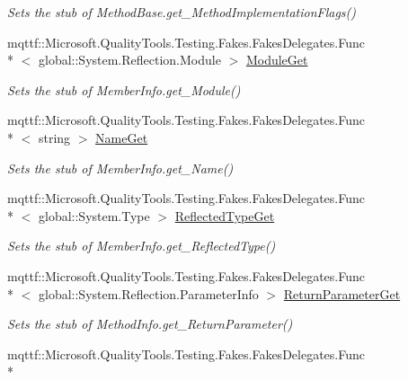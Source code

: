 \begin{DoxyCompactItemize}
\begin{DoxyCompactList}\small\item\em Sets the stub of Method\-Base.\-get\-\_\-\-Method\-Implementation\-Flags()\end{DoxyCompactList}\item 
mqttf\-::\-Microsoft.\-Quality\-Tools.\-Testing.\-Fakes.\-Fakes\-Delegates.\-Func\\*
$<$ global\-::\-System.\-Reflection.\-Module $>$ \hyperlink{class_system_1_1_reflection_1_1_fakes_1_1_stub_method_info_a620c5971673cda758bb46c427c317c3a}{Module\-Get}
\begin{DoxyCompactList}\small\item\em Sets the stub of Member\-Info.\-get\-\_\-\-Module()\end{DoxyCompactList}\item 
mqttf\-::\-Microsoft.\-Quality\-Tools.\-Testing.\-Fakes.\-Fakes\-Delegates.\-Func\\*
$<$ string $>$ \hyperlink{class_system_1_1_reflection_1_1_fakes_1_1_stub_method_info_abc33565f98fd727217015bf07f0422be}{Name\-Get}
\begin{DoxyCompactList}\small\item\em Sets the stub of Member\-Info.\-get\-\_\-\-Name()\end{DoxyCompactList}\item 
mqttf\-::\-Microsoft.\-Quality\-Tools.\-Testing.\-Fakes.\-Fakes\-Delegates.\-Func\\*
$<$ global\-::\-System.\-Type $>$ \hyperlink{class_system_1_1_reflection_1_1_fakes_1_1_stub_method_info_ae8c73b608ec668823274fbd75c5b8e59}{Reflected\-Type\-Get}
\begin{DoxyCompactList}\small\item\em Sets the stub of Member\-Info.\-get\-\_\-\-Reflected\-Type()\end{DoxyCompactList}\item 
mqttf\-::\-Microsoft.\-Quality\-Tools.\-Testing.\-Fakes.\-Fakes\-Delegates.\-Func\\*
$<$ global\-::\-System.\-Reflection.\-Parameter\-Info $>$ \hyperlink{class_system_1_1_reflection_1_1_fakes_1_1_stub_method_info_ace6aa764a8393988a10fca16063a638c}{Return\-Parameter\-Get}
\begin{DoxyCompactList}\small\item\em Sets the stub of Method\-Info.\-get\-\_\-\-Return\-Parameter()\end{DoxyCompactList}\item 
mqttf\-::\-Microsoft.\-Quality\-Tools.\-Testing.\-Fakes.\-Fakes\-Delegates.\-Func\\*

\end{DoxyCompactItemize}
